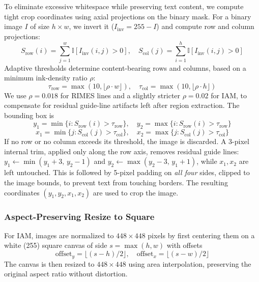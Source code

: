 \begin{appendices}
To eliminate excessive whitespace while preserving text content, we compute tight crop
coordinates using axial projections on the binary mask. For a binary image $I$ of size
$h \times w$, we invert it ($I_{\text{inv}} = 255 - I$) and compute row and column projections:
\begin{equation}
S_{\text{row}}(i) = \sum_{j=1}^{w} \mathbb{I}[I_{\text{inv}}(i,j) > 0], \quad
S_{\text{col}}(j) = \sum_{i=1}^{h} \mathbb{I}[I_{\text{inv}}(i,j) > 0]
\end{equation}
Adaptive thresholds determine content-bearing rows and columns, based on a minimum ink-density
ratio $\rho$:
\begin{equation}
\tau_{\text{row}} = \max(10, \lfloor \rho \cdot w \rfloor), \quad
\tau_{\text{col}} = \max(10, \lfloor \rho \cdot h \rfloor)
\end{equation}
We use $\rho = 0.018$ for RIMES lines and a slightly stricter $\rho = 0.02$ for IAM, to
compensate for residual guide-line artifacts left after region extraction. The bounding box is
\begin{equation}
y_1 = \min\{i : S_{\text{row}}(i) > \tau_{\text{row}}\}, \quad y_2 = \max\{i : S_{\text{row}}(i) > \tau_{\text{row}}\}
\end{equation}
\begin{equation}
x_1 = \min\{j : S_{\text{col}}(j) > \tau_{\text{col}}\}, \quad x_2 = \max\{j : S_{\text{col}}(j) > \tau_{\text{col}}\}
\end{equation}
If no row or no column exceeds its threshold, the image is discarded. A 3-pixel internal trim,
applied only along the row axis, removes residual guide lines:
$y_1 \leftarrow \min(y_1+3,\, y_2-1)$ and $y_2 \leftarrow \max(y_2-3,\, y_1+1)$, while
$x_1, x_2$ are left untouched. This is followed by 5-pixel padding on \emph{all four} sides,
clipped to the image bounds, to prevent text from touching borders. The resulting coordinates
$(y_1, y_2, x_1, x_2)$ are used to crop the image.

\subsubsection{Aspect-Preserving Resize to Square}

For IAM, images are normalized to $448\times448$ pixels by first centering them on a white
(255) square canvas of side $s = \max(h, w)$ with offsets
\begin{equation}
\text{offset}_y = \lfloor (s - h) / 2 \rfloor, \quad \text{offset}_x = \lfloor (s - w) / 2 \rfloor
\end{equation}
The canvas is then resized to $448\times448$ using area interpolation, preserving the original
aspect ratio without distortion.


\end{appendices}
